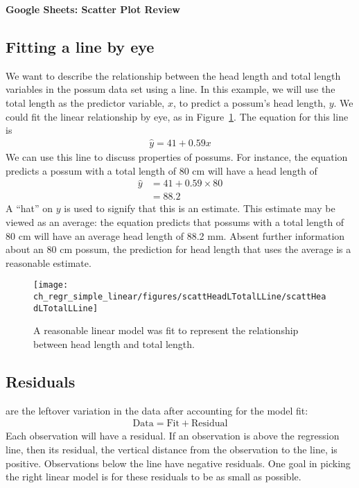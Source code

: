 \textC{\newpage}

\noindent\Large{\textbf{ {\color{ForestGreen} Google Sheets: Scatter Plot Review}}}
\normalsize

\subsection{Fitting a line by eye}

We want to describe the relationship between the head length and total length variables in the possum data set using a line. In this example, we will use the total length as the predictor variable, $x$, to predict a possum's head length, $y$. We could fit the linear relationship by eye, as in Figure~\ref{scattHeadLTotalLLine}. The equation for this line is
\begin{eqnarray}
\hat{y} = 41 + 0.59x
\label{headLLinModTotalL}
\end{eqnarray}
We can use this line to discuss properties of possums. For instance, the equation predicts a possum with a total length of 80 cm will have a head length of
\begin{align*}
\hat{y} &= 41 + 0.59\times 80 \\
	&= 88.2 %
\end{align*}
A ``hat'' on $y$ is used to signify that this is an estimate. This estimate may be viewed as an average: the equation predicts that possums with a total length of 80 cm will have an average head length of 88.2 mm. Absent further information about an 80 cm possum, the prediction for head length that uses the average is a reasonable estimate.

\begin{figure}
   \centering
   \texttt{[image: ch\_regr\_simple\_linear/figures/scattHeadLTotalLLine/scattHeadLTotalLLine]}
   \caption{A reasonable linear model was fit to represent the relationship between head length and total length.\textC{\vspace{-2mm}}}
   \label{scattHeadLTotalLLine}
\end{figure}

\subsection{Residuals}


 are the leftover variation in the data after accounting for the model fit:
\begin{align*}
\text{Data} = \text{Fit} + \text{Residual}
\end{align*}
Each observation will have a residual. If an observation is above the regression line, then its residual, the vertical distance from the observation to the line, is positive. Observations below the line have negative residuals. One goal in picking the right linear model is for these residuals to be as small as possible.

